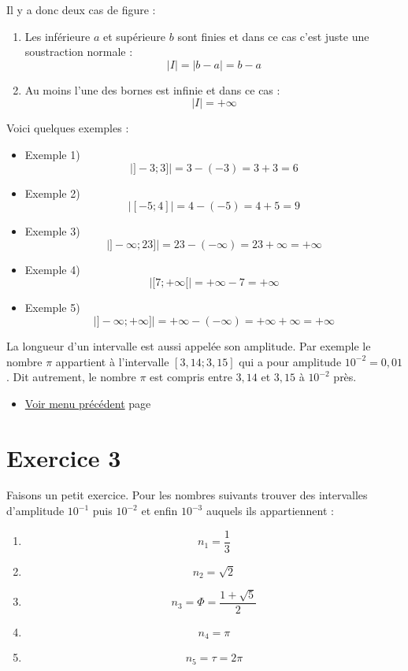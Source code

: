 \documentclass[a4paper,11pt]{book}
\begin{document}
Il y a donc deux cas de figure :

\begin{enumerate}
\item Les  inférieure \(a\) et supérieure \(b\) sont finies
et dans ce cas c'est juste une soustraction normale :
\[|I| = |b - a| = b - a\]
\item Au moins l'une des bornes est infinie et dans ce cas :
\[|I| = +\infty\]
\end{enumerate}


Voici quelques exemples :

\begin{itemize}
\item Exemple 1) \[\lvert ]-3 ; 3] \rvert = 3 - (-3) = 3 + 3 = 6\]
\item Exemple 2) \[\lvert [-5 ; 4] \rvert = 4 - (-5) = 4 + 5 = 9\]
\item Exemple 3) \[\lvert ]-\infty ; 23] \rvert = 23 - (-\infty) = 23 +\infty = +\infty\]
\item Exemple 4) \[\lvert [7 ; +\infty[ \rvert = +\infty - 7 = +\infty\]
\item Exemple 5) \[\lvert ]-\infty ; +\infty] \rvert = +\infty - (-\infty) =
  +\infty + \infty = +\infty\]
\end{itemize}



La longueur d'un intervalle est aussi appelée son
\gls{amplitude}. Par exemple le nombre \(\pi\) appartient à
l'intervalle \([3,14 ; 3,15]\) qui a pour amplitude \(10^{-2} =
0,01\). Dit autrement, le nombre \(\pi\) est compris entre \(3,14\) et
\(3,15\) à \(10^{-2}\) près.


\begin{itemize}
\item \hyperref[org6170d36]{Voir menu précédent}
page~\pageref{page:content2-menu}
\end{itemize}

\clearpage

\section{Exercice 3}
\label{sec:orgf521ac2}
\label{org61fbd6f}
\label{page:sec2.2.2exo3}

Faisons un petit exercice. Pour les nombres suivants trouver des
intervalles d'amplitude \(10^{-1}\) puis \(10^{-2}\) et enfin \(10^{-3}\)
auquels ils appartiennent :

\begin{enumerate}
\item \[n_1 = \dfrac{1}{3}\]
\item \[n_2 = \sqrt{2}\]
\item \[n_3 = \Phi = \dfrac{1 + \sqrt{5}}{2}\]
\item \[n_4 = \pi\]
\item \[n_5 = \tau = 2\pi\]
\end{enumerate}
\end{document}
